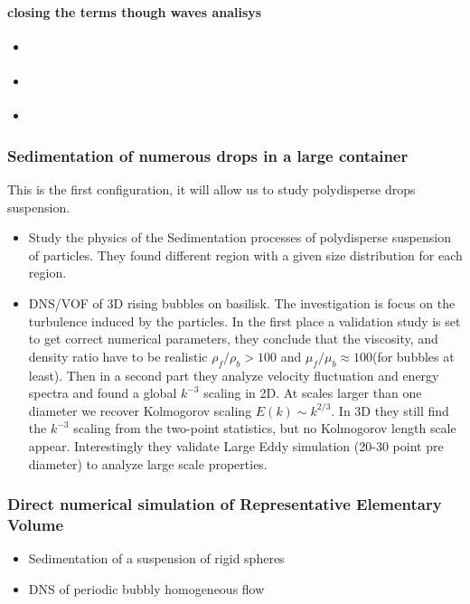 \paragraph{closing the terms though waves analisys}
\begin{itemize}
\subsubsection*{closing the terms though waves analisys}
    \item \cite{duru2002constitutive}
    \item \citet{willen2017continuity}
    \item \citet{derksen2007direct}
\end{itemize}
\subsubsection{Sedimentation of numerous drops in a large container}
This is the first configuration, it will allow us to study polydisperse  drops suspension.  
\begin{itemize}
    \item \citet{davis1985sedimentation} Study the physics of the Sedimentation processes of polydisperse suspension of particles. They found different region with a given size distribution for each region.
    \item DNS/VOF of 3D rising bubbles \citet{innocenti2020direct} on basilisk. 
    The investigation is focus on the turbulence induced by the particles. 
    In the first place a validation study is set to get correct numerical parameters, they conclude that the viscosity, and density ratio have to be realistic $\rho_f/\rho_b>100$ and $\mu_f/\mu_b \approx 100$(for bubbles at least).  
    Then in a second part they analyze velocity fluctuation and energy spectra and found a global $k ^{-3}$ scaling in 2D. At scales larger than one diameter we recover Kolmogorov scaling $E(k) \sim k^{2/3}$.   
    In 3D they still find the $k^{-3}$ scaling from the two-point statistics, but no Kolmogorov length scale appear. Interestingly they validate Large Eddy simulation (20-30 point pre diameter) to analyze large scale properties. 
\end{itemize}

\subsubsection{Direct numerical simulation of Representative Elementary Volume}
\begin{itemize}
    \item Sedimentation of a suspension of rigid spheres \citet{willen2019resolved}
    \item DNS of periodic bubbly homogeneous flow \citet{tryggvason2006direct}
\end{itemize}

